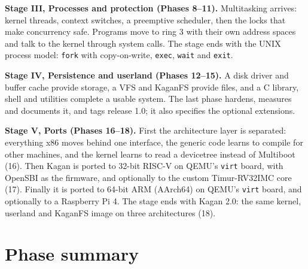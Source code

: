 \documentclass[11pt,a4paper]{article}
\begin{document}
\textbf{Stage III, Processes and protection (Phases 8--11).} Multitasking arrives: kernel threads, context switches,
a preemptive scheduler, then the locks that make concurrency safe. Programs move to ring 3 with their own address
spaces and talk to the kernel through system calls. The stage ends with the UNIX process model: \texttt{fork} with
copy-on-write, \texttt{exec}, \texttt{wait} and \texttt{exit}.

\textbf{Stage IV, Persistence and userland (Phases 12--15).} A disk driver and buffer cache provide storage, a VFS
and KaganFS provide files, and a C library, shell and utilities complete a usable system. The last phase hardens,
measures and documents it, and tags release 1.0; it also specifies the optional extensions.

\textbf{Stage V, Ports (Phases 16--18).} First the architecture layer is separated: everything x86 moves behind
one interface, the generic code learns to compile for other machines, and the kernel learns to read a devicetree
instead of Multiboot (16). Then Kagan is ported to 32-bit RISC-V on QEMU's \texttt{virt} board, with OpenSBI as
the firmware, and optionally to the custom Timur-RV32IMC core (17). Finally it is ported to 64-bit ARM (AArch64) on
QEMU's \texttt{virt} board, and optionally to a Raspberry Pi 4. The stage ends with Kagan 2.0: the same kernel,
userland and KaganFS image on three architectures (18).

\section{Phase summary}
\end{document}
